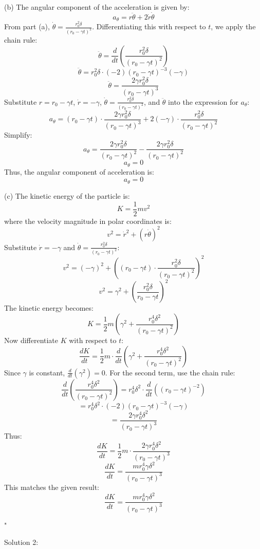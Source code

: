 (b) The angular component of the acceleration is given by:
\[
a_\theta = r \ddot{\theta} + 2 \dot{r} \dot{\theta}
\]
From part (a), \( \dot{\theta} = \frac{r_0^2 \delta}{(r_0 - \gamma t)^2} \). Differentiating this with respect to \( t \), we apply the chain rule:
\[
\ddot{\theta} = \frac{d}{dt} \left( \frac{r_0^2 \delta}{(r_0 - \gamma t)^2} \right)
\]
\[
\ddot{\theta} = r_0^2 \delta \cdot (-2) (r_0 - \gamma t)^{-3} (-\gamma)
\]
\[
\ddot{\theta} = \frac{2 \gamma r_0^2 \delta}{(r_0 - \gamma t)^3}
\]
Substitute \( r = r_0 - \gamma t \), \( \dot{r} = -\gamma \), \( \dot{\theta} = \frac{r_0^2 \delta}{(r_0 - \gamma t)^2} \), and \( \ddot{\theta} \) into the expression for \( a_\theta \):
\[
a_\theta = (r_0 - \gamma t) \cdot \frac{2 \gamma r_0^2 \delta}{(r_0 - \gamma t)^3} + 2 (-\gamma) \cdot \frac{r_0^2 \delta}{(r_0 - \gamma t)^2}
\]
Simplify:
\[
a_\theta = \frac{2 \gamma r_0^2 \delta}{(r_0 - \gamma t)^2} - \frac{2 \gamma r_0^2 \delta}{(r_0 - \gamma t)^2}
\]
\[
a_\theta = 0
\]
Thus, the angular component of acceleration is:
\[
\boxed{a_\theta = 0}
\]

(c) The kinetic energy of the particle is:
\[
K = \frac{1}{2} m v^2
\]
where the velocity magnitude in polar coordinates is:
\[
v^2 = \dot{r}^2 + (r \dot{\theta})^2
\]
Substitute \( \dot{r} = -\gamma \) and \( \dot{\theta} = \frac{r_0^2 \delta}{(r_0 - \gamma t)^2} \):
\[
v^2 = (-\gamma)^2 + \left( (r_0 - \gamma t) \cdot \frac{r_0^2 \delta}{(r_0 - \gamma t)^2} \right)^2
\]
\[
v^2 = \gamma^2 + \left( \frac{r_0^2 \delta}{r_0 - \gamma t} \right)^2
\]
The kinetic energy becomes:
\[
K = \frac{1}{2} m \left( \gamma^2 + \frac{r_0^4 \delta^2}{(r_0 - \gamma t)^2} \right)
\]
Now differentiate \( K \) with respect to \( t \):
\[
\frac{dK}{dt} = \frac{1}{2} m \cdot \frac{d}{dt} \left( \gamma^2 + \frac{r_0^4 \delta^2}{(r_0 - \gamma t)^2} \right)
\]
Since \( \gamma \) is constant, \( \frac{d}{dt}(\gamma^2) = 0 \). For the second term, use the chain rule:
\[
\frac{d}{dt} \left( \frac{r_0^4 \delta^2}{(r_0 - \gamma t)^2} \right) = r_0^4 \delta^2 \cdot \frac{d}{dt} \left( (r_0 - \gamma t)^{-2} \right)
\]
\[
= r_0^4 \delta^2 \cdot (-2)(r_0 - \gamma t)^{-3}(-\gamma)
\]
\[
= \frac{2 \gamma r_0^4 \delta^2}{(r_0 - \gamma t)^3}
\]
Thus:
\[
\frac{dK}{dt} = \frac{1}{2} m \cdot \frac{2 \gamma r_0^4 \delta^2}{(r_0 - \gamma t)^3}
\]
\[
\frac{dK}{dt} = \frac{m r_0^4 \gamma \delta^2}{(r_0 - \gamma t)^3}
\]
This matches the given result:
\[
\boxed{\frac{dK}{dt} = \frac{m r_0^4 \gamma \delta^2}{(r_0 - \gamma t)^3}}
\]

"

Solution 2: 

